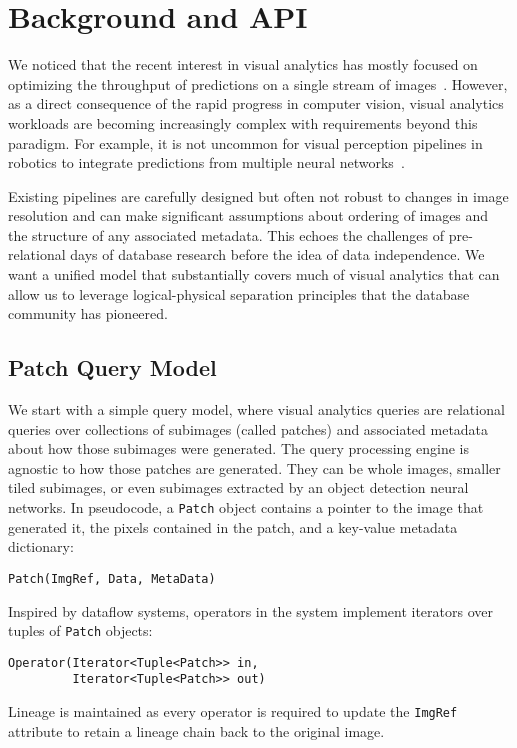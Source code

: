 \section{Background and API}
We noticed that the recent interest in visual analytics has mostly focused on optimizing the throughput of predictions on a single stream of images~\cite{anderson2018predicate, kang2018blazeit,kang2017noscope, wu2018querying, sparks2017keystoneml}.
However, as a direct consequence of the rapid progress in computer vision, visual analytics workloads are becoming increasingly complex with requirements beyond this paradigm. 
For example, it is not uncommon for visual perception pipelines in robotics to integrate predictions from multiple neural networks~\cite{hodson2018robots}.

Existing pipelines are carefully designed
but often not robust to changes in image resolution and can make significant assumptions about ordering of images and the structure of any associated metadata.
This echoes the challenges of pre-relational days of database research before the idea of data independence.
We want a unified model that substantially covers much of visual analytics that can allow us to leverage logical-physical separation principles that the database community has pioneered.

\subsection{Patch Query Model}
We start with a simple query model, where visual analytics queries are relational queries over collections of subimages (called patches) and associated metadata about how those subimages were generated.
The query processing engine is agnostic to how those patches are generated.
They can be whole images, smaller tiled subimages, or even subimages extracted by an object detection neural networks.
In pseudocode, a \texttt{Patch} object contains a pointer to the image that generated it, the pixels contained in the patch, and a key-value metadata dictionary:
\begin{lstlisting}
Patch(ImgRef, Data, MetaData)
\end{lstlisting}
Inspired by dataflow systems, operators in the system implement iterators over tuples of \texttt{Patch} objects:
\begin{lstlisting}
Operator(Iterator<Tuple<Patch>> in, 
         Iterator<Tuple<Patch>> out)
\end{lstlisting}
Lineage is maintained as every operator is required to update the \texttt{ImgRef} attribute to retain a lineage chain back to the original image.

